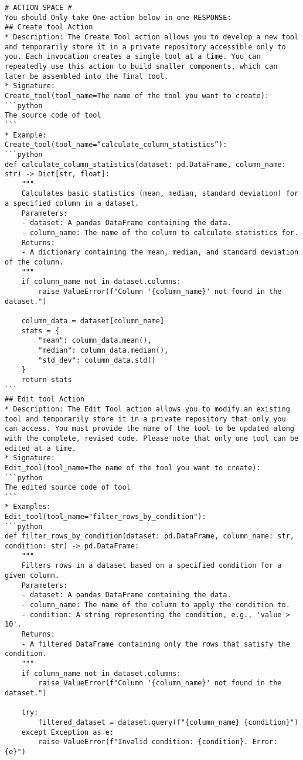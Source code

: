 \begin{tcolorbox}[title=Tool Manager's Prompt, breakable, width=\textwidth,top=0mm]
\begin{Verbatim}[breaklines, fontsize=\footnotesize]
# ACTION SPACE #
You should Only take One action below in one RESPONSE:
## Create tool Action
* Description: The Create Tool action allows you to develop a new tool and temporarily store it in a private repository accessible only to you. Each invocation creates a single tool at a time. You can repeatedly use this action to build smaller components, which can later be assembled into the final tool.
* Signature: 
Create_tool(tool_name=The name of the tool you want to create):
```python
The source code of tool
```
* Example:
Create_tool(tool_name=“calculate_column_statistics”):
```python
def calculate_column_statistics(dataset: pd.DataFrame, column_name: str) -> Dict[str, float]:
    """
    Calculates basic statistics (mean, median, standard deviation) for a specified column in a dataset.
    Parameters:
    - dataset: A pandas DataFrame containing the data.
    - column_name: The name of the column to calculate statistics for.
    Returns:
    - A dictionary containing the mean, median, and standard deviation of the column.
    """
    if column_name not in dataset.columns:
        raise ValueError(f"Column '{column_name}' not found in the dataset.")
    
    column_data = dataset[column_name]
    stats = {
        "mean": column_data.mean(),
        "median": column_data.median(),
        "std_dev": column_data.std()
    }
    return stats
```
## Edit tool Action
* Description: The Edit Tool action allows you to modify an existing tool and temporarily store it in a private repository that only you can access. You must provide the name of the tool to be updated along with the complete, revised code. Please note that only one tool can be edited at a time.
* Signature: 
Edit_tool(tool_name=The name of the tool you want to create):
```python
The edited source code of tool
```
* Examples:
Edit_tool(tool_name="filter_rows_by_condition"):
```python
def filter_rows_by_condition(dataset: pd.DataFrame, column_name: str, condition: str) -> pd.DataFrame:
    """
    Filters rows in a dataset based on a specified condition for a given column.
    Parameters:
    - dataset: A pandas DataFrame containing the data.
    - column_name: The name of the column to apply the condition to.
    - condition: A string representing the condition, e.g., 'value > 10'.
    Returns:
    - A filtered DataFrame containing only the rows that satisfy the condition.
    """
    if column_name not in dataset.columns:
        raise ValueError(f"Column '{column_name}' not found in the dataset.")
    
    try:
        filtered_dataset = dataset.query(f"{column_name} {condition}")
    except Exception as e:
        raise ValueError(f"Invalid condition: {condition}. Error: {e}")
    

\end{Verbatim}
\end{tcolorbox}
